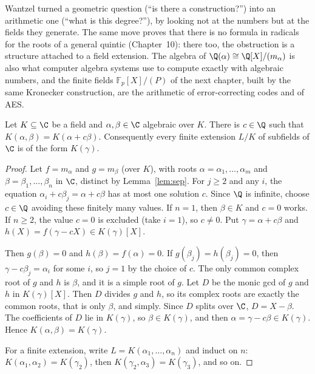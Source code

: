 \begin{beauty}
Wantzel turned a geometric question (``is there a construction?'') into an arithmetic one (``what is this degree?''), by looking not at the numbers but at the fields they generate. The same move proves that there is no formula in radicals for the roots of a general quintic (Chapter~10): there too, the obstruction is a structure attached to a field extension. The algebra of $\Q(\alpha)\cong\Q[X]/(m_\alpha)$ is also what computer algebra systems use to compute exactly with algebraic numbers, and the finite fields $\mathbb F_p[X]/(P)$ of the next chapter, built by the same Kronecker construction, are the arithmetic of error-correcting codes and of AES.
\end{beauty}

\begin{theorem}\label{thm:primitiveelement}
Let $K\subseteq\C$ be a field and $\alpha,\beta\in\C$ algebraic over $K$. There is $c\in\Q$ such that $K(\alpha,\beta)=K(\alpha+c\beta)$. Consequently every finite extension $L/K$ of subfields of $\C$ is of the form $K(\gamma)$.
\end{theorem}
\begin{proof}
Let $f=m_\alpha$ and $g=m_\beta$ (over $K$), with roots $\alpha=\alpha_1,\dots,\alpha_m$ and $\beta=\beta_1,\dots,\beta_n$ in $\C$, distinct by Lemma~\ref{lem:sep}. For $j\ge2$ and any $i$, the equation $\alpha_i+c\beta_j=\alpha+c\beta$ has at most one solution $c$. Since $\Q$ is infinite, choose $c\in\Q$ avoiding these finitely many values. If $n=1$, then $\beta\in K$ and $c=0$ works. If $n\ge2$, the value $c=0$ is excluded (take $i=1$), so $c\ne0$. Put $\gamma=\alpha+c\beta$ and $h(X)=f(\gamma-cX)\in K(\gamma)[X]$.

Then $g(\beta)=0$ and $h(\beta)=f(\alpha)=0$. If $g(\beta_j)=h(\beta_j)=0$, then $\gamma-c\beta_j=\alpha_i$ for some $i$, so $j=1$ by the choice of $c$. The only common complex root of $g$ and $h$ is $\beta$, and it is a simple root of $g$. Let $D$ be the monic gcd of $g$ and $h$ in $K(\gamma)[X]$. Then $D$ divides $g$ and $h$, so its complex roots are exactly the common roots, that is only $\beta$, and simply. Since $D$ splits over $\C$, $D=X-\beta$. The coefficients of $D$ lie in $K(\gamma)$, so $\beta\in K(\gamma)$, and then $\alpha=\gamma-c\beta\in K(\gamma)$. Hence $K(\alpha,\beta)=K(\gamma)$.

For a finite extension, write $L=K(\alpha_1,\dots,\alpha_n)$ and induct on $n$: $K(\alpha_1,\alpha_2)=K(\gamma_2)$, then $K(\gamma_2,\alpha_3)=K(\gamma_3)$, and so on.
\end{proof}

